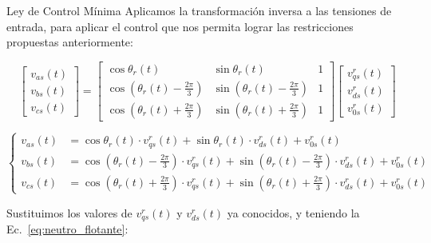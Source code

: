\documentclass[12pt]{beamer}
\begin{document}
\begin{frame}{Ley de Control Mínima}\tiny
Aplicamos la transformación inversa a las tensiones de entrada, para aplicar el control que nos permita lograr las restricciones propuestas anteriormente:

\begin{equation}
\begin{bmatrix}
v_{as}(t) \\
v_{bs}(t) \\
v_{cs}(t)
\end{bmatrix} = 
\begin{bmatrix}
\cos \theta_r(t) & \sin \theta_r(t) & 1 \\
\cos(\theta_r(t)-\frac{2\pi}{3}) & \sin(\theta_r(t)-\frac{2\pi}{3}) & 1 \\
\cos(\theta_r(t)+\frac{2\pi}{3}) & \sin(\theta_r(t)+\frac{2\pi}{3}) & 1
\end{bmatrix}
\begin{bmatrix}
v^r_{qs}(t) \\
v^r_{ds}(t) \\
v^r_{0s}(t)
\end{bmatrix}
\label{Ec.37}
\end{equation}

\begin{equation}
\begin{cases}
v_{as}(t) &= \cos \theta_r(t)\cdot v^r_{qs}(t) + \sin \theta_r(t)\cdot v^r_{ds}(t) + v^r_{0s}(t) \\
v_{bs}(t) &= \cos\left(\theta_r(t)-\frac{2\pi}{3}\right)\cdot v^r_{qs}(t) + \sin\left(\theta_r(t)-\frac{2\pi}{3}\right)\cdot v^r_{ds}(t) + v^r_{0s}(t) \\
v_{cs}(t) &= \cos\left(\theta_r(t)+\frac{2\pi}{3}\right)\cdot v^r_{qs}(t) + \sin\left(\theta_r(t)+\frac{2\pi}{3}\right)\cdot v^r_{ds}(t) + v^r_{0s}(t)
\end{cases}
\end{equation}

Sustituimos los valores de $v^r_{qs}(t)$ y $v^r_{ds}(t)$ ya conocidos, y teniendo la Ec.~\ref{eq:neutro_flotante}:


\end{frame}
\end{document}
